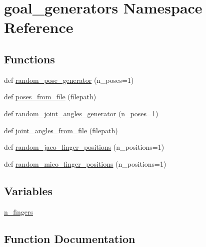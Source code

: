 \hypertarget{namespacegoal__generators}{}\section{goal\+\_\+generators Namespace Reference}
\label{namespacegoal__generators}
\subsection*{Functions}
\begin{DoxyCompactItemize}
\item 
def \hyperlink{namespacegoal__generators_acc20fd60c84b4f30491d22bf16139668}{random\+\_\+pose\+\_\+generator} (n\+\_\+poses=1)
\item 
def \hyperlink{namespacegoal__generators_a565aa27b68e73f1f3b2d1a9da1332051}{poses\+\_\+from\+\_\+file} (filepath)
\item 
def \hyperlink{namespacegoal__generators_a6ab109de507bd107dedc7801ca7c5381}{random\+\_\+joint\+\_\+angles\+\_\+generator} (n\+\_\+poses=1)
\item 
def \hyperlink{namespacegoal__generators_a39b5582c84cdf5891bf92b77ab9c0b3b}{joint\+\_\+angles\+\_\+from\+\_\+file} (filepath)
\item 
def \hyperlink{namespacegoal__generators_a2b395bfee98a60349c6a7193e8d3059f}{random\+\_\+jaco\+\_\+finger\+\_\+positions} (n\+\_\+positions=1)
\item 
def \hyperlink{namespacegoal__generators_a092d3fe84232b5b0ead199e6d5a822eb}{random\+\_\+mico\+\_\+finger\+\_\+positions} (n\+\_\+positions=1)
\end{DoxyCompactItemize}
\subsection*{Variables}
\begin{DoxyCompactItemize}
\item 
\hyperlink{namespacegoal__generators_a8ffcfd842ed393511c7ee860baa70446}{n\+\_\+fingers}
\end{DoxyCompactItemize}


\subsection{Function Documentation}
